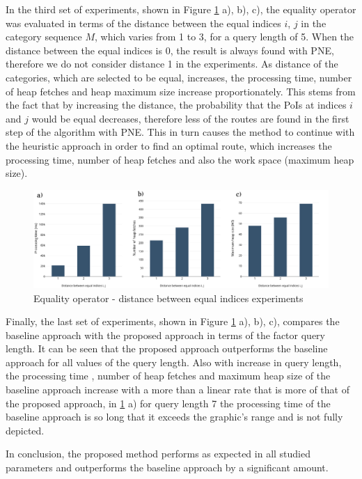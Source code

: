 In the third set of experiments, shown in Figure \ref{fig:eo_distance} a), b), c), the equality operator was evaluated in terms of the  distance between the equal indices $i$, $j$ in the category sequence $M$, which varies from 1 to 3, for a query length of 5. When the distance between the equal indices is 0, the result is always found with PNE, therefore we do not consider distance 1 in the experiments. 
As distance of the categories, which are selected to be equal, increases, the processing time, number of heap fetches and heap maximum size increase proportionately. This stems from the fact that by increasing the distance, the probability that the PoIs at indices $i$ and $j$ would be equal decreases, therefore less of the routes are found in the first step of the algorithm with PNE. This in turn causes the method to continue with the heuristic approach in order to find an optimal route, which increases the processing time, number of heap fetches and also the work space (maximum heap size).

\begin{figure}[H]
	\includegraphics[scale=0.3]{images/eo_distance.png}
	\centering
	\caption{Equality operator - distance between equal indices experiments}
	\label{fig:eo_distance}
\end{figure}

Finally, the last set of experiments, shown in Figure \ref{fig:eo_distance} a), b), c), compares the baseline approach with the proposed approach in terms of the factor query length. It can be seen that the proposed approach outperforms the baseline approach for all values of the query length. Also with increase in query length, the processing time , number of heap fetches and maximum heap size of the baseline approach increase with a more than a linear rate that is more of that of the proposed approach, in \ref{fig:eo_distance} a) for query length 7 the processing time of the baseline approach is so long that it exceeds the graphic's range and is not fully depicted.

In conclusion, the proposed method performs as expected in all studied parameters and outperforms the baseline approach by a significant amount. 


